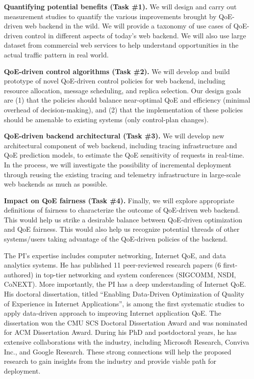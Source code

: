 \begin{packeditemize}
\item{\bf Quantifying potential benefits (Task \#1).}
We will design and carry out measurement studies to quantify the various improvements brought by QoE-driven web backend in the wild. We will provide a taxonomy of use cases of QoE-driven control in different aspects of today's web backend. We will also use large dataset from commercial web services to help understand opportunities in the actual traffic pattern in real world.

\item{\bf QoE-driven control algorithms (Task \#2).}
We will develop and build prototype of novel QoE-driven control policies for web backend, including resource allocation, message scheduling, and replica selection. Our design goals are (1) that the policies should balance near-optimal QoE and efficiency (minimal overhead of decision-making), and (2) that the implementation of these policies should be amenable to existing systems (\eg only control-plan changes).

\item{\bf QoE-driven backend architectural (Task \#3).}
We will develop new architectural component of web backend, including tracing infrastructure and QoE prediction models, to estimate the QoE sensitivity of requests in real-time. In the process, we will investigate the possibility of incremental deployment through reusing the existing tracing and telemetry infrastructure in large-scale web backends as much as possible.

\item{\bf Impact on QoE fairness (Task \#4).}
Finally, we will explore appropriate definitions of fairness to characterize the outcome of QoE-driven web backend. This would help us strike a desirable balance between QoE-driven optimization and QoE fairness. This would also help us recognize potential threads of other systems/users taking advantage of the QoE-driven policies of the backend.

\end{packeditemize}




The PI's expertise includes computer networking, Internet QoE, and data analytics systems.
He has published 11 peer-reviewed research papers (6 first-authored) in top-tier networking and system conferences (\ie SIGCOMM, NSDI, CoNEXT).
More importantly, the PI has a deep understanding of Internet QoE. His doctoral dissertation, titled ``Enabling Data-Driven Optimization of Quality of Experience in Internet Applications'', is among the first systematic studies to apply data-driven approach to improving Internet application QoE. The dissertation won the CMU SCS Doctoral Dissertation Award and was nominated for ACM Dissertation Award.
During his PhD and postdoctoral years, he has extensive collaborations with the industry, including Microsoft Research, Conviva Inc., and Google Research. These strong connections will help the proposed research to gain insights from the industry and provide viable path for deployment.


